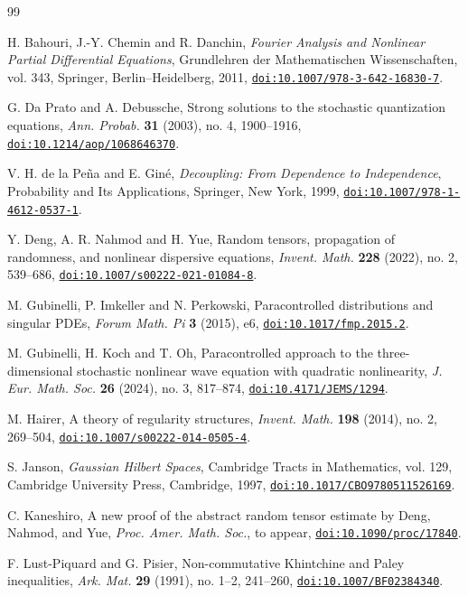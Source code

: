 \documentclass[11pt,reqno]{amsart}
\newcommand{\doi}[1]{\href{https://doi.org/#1}{\nolinkurl{doi:#1}}}
\numberwithin{equation}{section}
\theoremstyle{plain}
\theoremstyle{definition}
\begin{document}
{}
\begingroup\small
\begin{thebibliography}{99}

H. Bahouri, J.-Y. Chemin and R. Danchin,
\emph{Fourier Analysis and Nonlinear Partial Differential Equations},
Grundlehren der Mathematischen Wissenschaften, vol. 343,
Springer, Berlin--Heidelberg, 2011,
\doi{10.1007/978-3-642-16830-7}.

G. Da Prato and A. Debussche,
Strong solutions to the stochastic quantization equations,
\emph{Ann. Probab.} \textbf{31} (2003), no. 4, 1900--1916,
\doi{10.1214/aop/1068646370}.

V. H. de la Pe\~na and E. Gin\'e,
\emph{Decoupling: From Dependence to Independence},
Probability and Its Applications, Springer, New York, 1999,
\doi{10.1007/978-1-4612-0537-1}.

Y. Deng, A. R. Nahmod and H. Yue,
Random tensors, propagation of randomness, and nonlinear dispersive equations,
\emph{Invent. Math.} \textbf{228} (2022), no. 2, 539--686,
\doi{10.1007/s00222-021-01084-8}.

M. Gubinelli, P. Imkeller and N. Perkowski,
Paracontrolled distributions and singular PDEs,
\emph{Forum Math. Pi} \textbf{3} (2015), e6,
\doi{10.1017/fmp.2015.2}.

M. Gubinelli, H. Koch and T. Oh,
Paracontrolled approach to the three-dimensional stochastic nonlinear wave equation with quadratic nonlinearity,
\emph{J. Eur. Math. Soc.} \textbf{26} (2024), no. 3, 817--874,
\doi{10.4171/JEMS/1294}.

M. Hairer,
A theory of regularity structures,
\emph{Invent. Math.} \textbf{198} (2014), no. 2, 269--504,
\doi{10.1007/s00222-014-0505-4}.

S. Janson,
\emph{Gaussian Hilbert Spaces},
Cambridge Tracts in Mathematics, vol. 129,
Cambridge University Press, Cambridge, 1997,
\doi{10.1017/CBO9780511526169}.

C. Kaneshiro,
A new proof of the abstract random tensor estimate by Deng, Nahmod, and Yue,
\emph{Proc. Amer. Math. Soc.}, to appear,
\doi{10.1090/proc/17840}.

F. Lust-Piquard and G. Pisier,
Non-commutative Khintchine and Paley inequalities,
\emph{Ark. Mat.} \textbf{29} (1991), no. 1--2, 241--260,
\doi{10.1007/BF02384340}.


\end{thebibliography}
\end{document}
